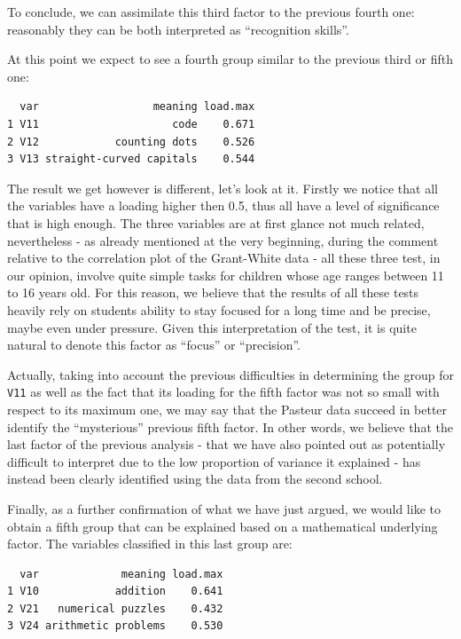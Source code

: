 \documentclass[
  letterpaper,
  DIV=11,
  numbers=noendperiod]{scrartcl}
\begin{document}
To conclude, we can assimilate this third factor to the previous fourth
one: reasonably they can be both interpreted as ``recognition skills''.

At this point we expect to see a fourth group similar to the previous
third or fifth one:

\begin{verbatim}
  var                  meaning load.max
1 V11                     code    0.671
2 V12            counting dots    0.526
3 V13 straight-curved capitals    0.544
\end{verbatim}

The result we get however is different, let's look at it. Firstly we
notice that all the variables have a loading higher then 0.5, thus all
have a level of significance that is high enough. The three variables
are at first glance not much related, nevertheless - as already
mentioned at the very beginning, during the comment relative to the
correlation plot of the Grant-White data - all these three test, in our
opinion, involve quite simple tasks for children whose age ranges
between 11 to 16 years old. For this reason, we believe that the results
of all these tests heavily rely on students ability to stay focused for
a long time and be precise, maybe even under pressure. Given this
interpretation of the test, it is quite natural to denote this factor as
``focus'' or ``precision''.

Actually, taking into account the previous difficulties in determining
the group for \texttt{V11} as well as the fact that its loading for the
fifth factor was not so small with respect to its maximum one, we may
say that the Pasteur data succeed in better identify the ``mysterious''
previous fifth factor. In other words, we believe that the last factor
of the previous analysis - that we have also pointed out as potentially
difficult to interpret due to the low proportion of variance it
explained - has instead been clearly identified using the data from the
second school.

Finally, as a further confirmation of what we have just argued, we would
like to obtain a fifth group that can be explained based on a
mathematical underlying factor. The variables classified in this last
group are:

\begin{verbatim}
  var             meaning load.max
1 V10            addition    0.641
2 V21   numerical puzzles    0.432
3 V24 arithmetic problems    0.530
\end{verbatim}
\end{document}
